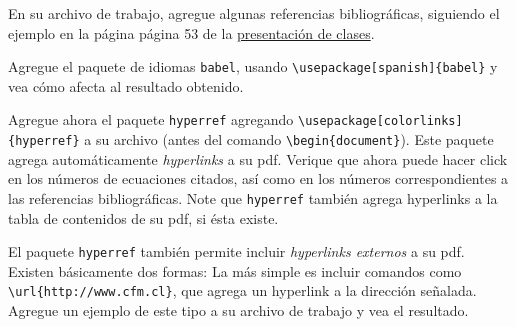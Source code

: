 \documentclass[11pt]{exam}
\begin{document}
\begin{questions}

\item En su archivo de trabajo, agregue algunas referencias bibliográficas, siguiendo el ejemplo en la página página 53 de la \href{https://udec.instructure.com/courses/40179/pages/latex-pdf-presentacion?module_item_id=1465499}{presentación de clases}.

\item Agregue el paquete de idiomas \texttt{babel}, usando \verb|\usepackage[spanish]{babel}| y vea cómo afecta al resultado obtenido.

\item Agregue ahora el paquete \texttt{hyperref} agregando 
\verb|\usepackage[colorlinks]{hyperref}| a su archivo (antes del comando \verb|\begin{document}|). Este paquete agrega automáticamente \textit{hyperlinks} a su pdf. Verique que ahora puede hacer click en los números de ecuaciones citados, así como en los números correspondientes a las referencias bibliográficas. Note que \texttt{hyperref} también agrega hyperlinks a la tabla de contenidos de su pdf, si ésta existe.

\item El paquete \texttt{hyperref} también permite incluir \textit{hyperlinks externos} a su pdf. Existen básicamente dos formas: La más simple es incluir comandos como \verb|\url{http://www.cfm.cl}|, que agrega un hyperlink a la dirección señalada. Agregue un ejemplo de este tipo a su archivo de trabajo y vea el resultado.


\end{questions}
\end{document}
